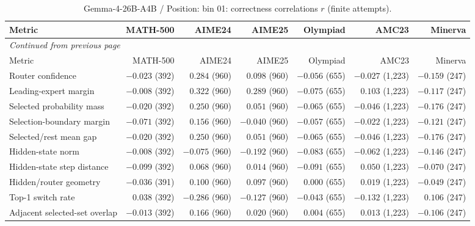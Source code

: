 \begingroup\scriptsize\setlength{\tabcolsep}{4pt}
\begin{longtable}{@{}lrrrrrr@{}}
\caption{Gemma-4-26B-A4B / Position: bin 01: correctness correlations $r$ (finite attempts).}\label{tab:multi-gemma-position-bin_01}\\
\toprule
Metric & MATH-500 & AIME24 & AIME25 & Olympiad & AMC23 & Minerva \\
\midrule\endfirsthead
\multicolumn{7}{l}{\textit{Continued from previous page}}\\
\toprule
Metric & MATH-500 & AIME24 & AIME25 & Olympiad & AMC23 & Minerva \\
\midrule\endhead
\bottomrule\endfoot
Router confidence & $-0.023$ (392) & $0.284$ (960) & $0.098$ (960) & $-0.056$ (655) & $-0.027$ (1,223) & $-0.159$ (247) \\
Leading-expert margin & $-0.008$ (392) & $0.322$ (960) & $0.289$ (960) & $-0.075$ (655) & $0.103$ (1,223) & $-0.117$ (247) \\
Selected probability mass & $-0.020$ (392) & $0.250$ (960) & $0.051$ (960) & $-0.065$ (655) & $-0.046$ (1,223) & $-0.176$ (247) \\
Selection-boundary margin & $-0.071$ (392) & $0.156$ (960) & $-0.040$ (960) & $-0.057$ (655) & $-0.022$ (1,223) & $-0.121$ (247) \\
Selected/rest mean gap & $-0.020$ (392) & $0.250$ (960) & $0.051$ (960) & $-0.065$ (655) & $-0.046$ (1,223) & $-0.176$ (247) \\
Hidden-state norm & $-0.008$ (392) & $-0.075$ (960) & $-0.192$ (960) & $-0.083$ (655) & $-0.062$ (1,223) & $-0.146$ (247) \\
Hidden-state step distance & $-0.099$ (392) & $0.068$ (960) & $0.014$ (960) & $-0.091$ (655) & $0.050$ (1,223) & $-0.070$ (247) \\
Hidden/router geometry & $-0.036$ (391) & $0.100$ (960) & $0.097$ (960) & $0.000$ (655) & $0.019$ (1,223) & $-0.049$ (247) \\
Top-1 switch rate & $0.038$ (392) & $-0.286$ (960) & $-0.127$ (960) & $-0.043$ (655) & $-0.132$ (1,223) & $0.106$ (247) \\
Adjacent selected-set overlap & $-0.013$ (392) & $0.166$ (960) & $0.020$ (960) & $0.004$ (655) & $0.013$ (1,223) & $-0.106$ (247) \\
\end{longtable}\endgroup

